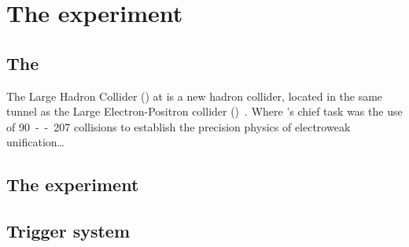 \chapter{The \CMS experiment}
\label{chap:detector}


\section{The \LHC}
The Large Hadron Collider (\LHC) at \CERN is a new hadron collider,
located in the same tunnel as the Large Electron-Positron collider
(\LEP)~\cite{Brianti:2004qq}. Where \LEP's chief task was the use
of \unit{90--207}{\GeV} \epluseminus collisions to establish the
precision physics of electroweak unification\dots

\section{The \CMS experiment}
\label{sec:CMSInDetail}


\section{Trigger system}
\label{sec:triggers}
